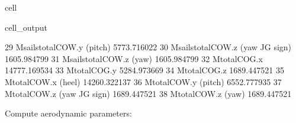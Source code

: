 \documentclass[letterpaper,10pt,english]{jupyterBook}
\begin{document}
\begin{sphinxuseclass}{cell}
\begin{sphinxVerbatimOutput}
\begin{sphinxuseclass}{cell_output}
\begin{sphinxVerbatim}[commandchars=\\\{\}]
29          M\PYGZus{}sails\PYGZus{}total\PYGZus{}COW.y (pitch)  \PYGZhy{}5773.716022
30  M\PYGZus{}sails\PYGZus{}total\PYGZus{}COW.z (yaw \PYGZhy{} JG sign)  \PYGZhy{}1605.984799
31            M\PYGZus{}sails\PYGZus{}total\PYGZus{}COW.z (yaw)   1605.984799
32                        M\PYGZus{}total\PYGZus{}COG.x \PYGZhy{}14777.169534
33                        M\PYGZus{}total\PYGZus{}COG.y  \PYGZhy{}5284.973669
34                        M\PYGZus{}total\PYGZus{}COG.z   1689.447521
35                 M\PYGZus{}total\PYGZus{}COW.x (heel) \PYGZhy{}14260.322137
36                M\PYGZus{}total\PYGZus{}COW.y (pitch)  \PYGZhy{}6552.777935
37        M\PYGZus{}total\PYGZus{}COW.z (yaw \PYGZhy{} JG sign)  \PYGZhy{}1689.447521
38                  M\PYGZus{}total\PYGZus{}COW.z (yaw)   1689.447521
\end{sphinxVerbatim}

\end{sphinxuseclass}\end{sphinxVerbatimOutput}

\end{sphinxuseclass}
\sphinxAtStartPar
Compute aerodynamic parameters:
\end{document}
